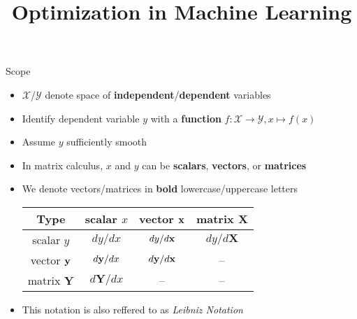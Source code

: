 \documentclass[11pt,compress,t,notes=noshow, xcolor=table]{beamer}
\title{Optimization in Machine Learning}
\newcommand{\deriv}{d}
\begin{document}


\begin{vbframe}{Scope}
\begin{itemize}
    \setlength{\itemsep}{0.5\baselineskip}
    \item $\mathcal{X}$/$\mathcal{Y}$ denote space of \textbf{independent}/\textbf{dependent} variables
    \item Identify dependent variable $y$ with a \textbf{function} $f: \mathcal{X} \to \mathcal{Y}, x\mapsto f(x)$
    \item Assume $y$ sufficiently smooth
    \item In matrix calculus, $x$ and $y$ can be \textbf{scalars}, \textbf{vectors}, or \textbf{matrices}
        \item We denote vectors/matrices in \textbf{bold} lowercase/uppercase letters
        \vspace{0.5\baselineskip}
        \begin{table}
            \centering
            \begin{tabular}{c||c|c|c}
                 Type & scalar $x$ & vector $\mathbf{x}$ & matrix $\mathbf{X}$ \\ \hline\hline
                 scalar $y$ & $\deriv y / \deriv x$ & $\deriv y / \deriv\xv$ & $\deriv y / \deriv\mathbf{X}$ \\ \hline
                 vector $\mathbf{y}$ & $\deriv\yv / \deriv x$ & $\deriv\yv / \deriv\xv$ & -- \\ \hline
                 matrix $\mathbf{Y}$ & $\deriv\mathbf{Y} / \deriv x$ & -- & --
            \end{tabular}
        \end{table}
        \item This notation is also reffered to as \emph{Leibniz Notation}
\end{itemize}
\end{vbframe}
\end{document}
